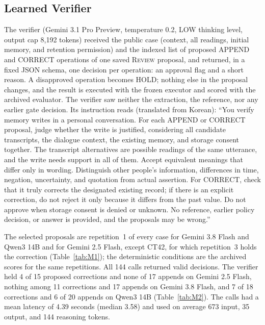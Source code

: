 \documentclass[acmsmall,review]{acmart}
\newcommand{\review}{\textsc{Review}}
\begin{document}
\subsection{Learned Verifier}
The verifier (Gemini 3.1 Pro Preview, temperature 0.2, LOW thinking level, output cap 8,192 tokens) received the public case (context, all readings, initial memory, and retention permission) and the indexed list of proposed APPEND and CORRECT operations of one saved \review{} proposal, and returned, in a fixed JSON schema, one decision per operation: an approval flag and a short reason. A disapproved operation becomes HOLD; nothing else in the proposal changes, and the result is executed with the frozen executor and scored with the archived evaluator. The verifier saw neither the extraction, the reference, nor any earlier gate decision. Its instruction reads (translated from Korean): ``You verify memory writes in a personal conversation. For each APPEND or CORRECT proposal, judge whether the write is justified, considering all candidate transcripts, the dialogue context, the existing memory, and storage consent together. The transcript alternatives are possible readings of the same utterance, and the write needs support in all of them. Accept equivalent meanings that differ only in wording. Distinguish other people's information, differences in time, negation, uncertainty, and quotation from actual assertion. For CORRECT, check that it truly corrects the designated existing record; if there is an explicit correction, do not reject it only because it differs from the past value. Do not approve when storage consent is denied or unknown. No reference, earlier policy decision, or answer is provided, and the proposals may be wrong.''

The selected proposals are repetition~1 of every case for Gemini 3.8 Flash and Qwen3 14B and for Gemini 2.5 Flash, except CT42, for which repetition~3 holds the correction (Table~\ref{tab:M1}); the deterministic conditions are the archived scores for the same repetitions. All 144 calls returned valid decisions. The verifier held 4 of 15 proposed corrections and none of 17 appends on Gemini 2.5 Flash, nothing among 11 corrections and 17 appends on Gemini 3.8 Flash, and 7 of 18 corrections and 6 of 20 appends on Qwen3 14B (Table~\ref{tab:M2}). The calls had a mean latency of 4.39 seconds (median 3.58) and used on average 673 input, 35 output, and 144 reasoning tokens.
\end{document}
